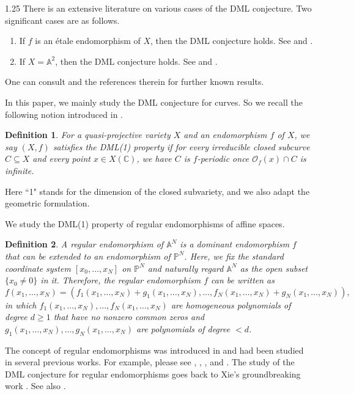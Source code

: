 \documentclass[12pt]{article}
\newtheorem{definition}{Definition}[section]
\begin{document}
\begin{spacing}{1.25}
There is an extensive literature on various cases of the DML conjecture. Two significant cases are as follows.

\begin{enumerate}
\item
If $f$ is an \'etale endomorphism of $X$, then the DML conjecture holds. See \cite{Bel06} and \cite[Theorem 1.3]{BGT10}.
\item
If $X = \mathbb{A}^2$, then the DML conjecture holds. See \cite{Xie17} and \cite[Theorem 4]{Xie}.
\end{enumerate}

One can consult \cite{BGT16,Xie} and the references therein for further known results.

In this paper, we mainly study the DML conjecture for curves. So we recall the following notion introduced in \cite[Definition 3]{Xie}.

\begin{definition}\label{DML1}
For a quasi-projective variety $X$ and an endomorphism $f$ of $X$, we say $(X,f)$ satisfies the \emph{DML(1) property} if for every irreducible closed subcurve $C\subseteq X$ and every point $x\in X(\mathbb{C})$, we have $C$ is $f$-periodic once $\mathcal{O}_f(x)\cap C$ is infinite.
\end{definition}

Here ``1" stands for the dimension of the closed subvariety, and we also adapt the geometric formulation.

We study the DML(1) property of regular endomorphisms of affine spaces.

\begin{definition}\label{regendo}
A \emph{regular endomorphism} of $\mathbb{A}^N$ is a dominant endomorphism $f$ that can be extended to an endomorphism of $\mathbb{P}^N$. Here, we fix the standard coordinate system $[x_0,\dots,x_N]$ on $\mathbb{P}^N$ and naturally regard $\mathbb{A}^N$ as the open subset $\{x_0\neq0\}$ in it. Therefore, the regular endomorphism $f$ can be written as
$$
f(x_1,\dots,x_N)=(f_1(x_1,\dots,x_N)+g_1(x_1,\dots,x_N),\dots,f_N(x_1,\dots,x_N)+g_N(x_1,\dots,x_N)),
$$
in which $f_1(x_1,\dots,x_N),\dots,f_N(x_1,\dots,x_N)$ are homogeneous polynomials of degree $d\geq1$ that have no nonzero common zeros and $g_1(x_1,\dots,x_N),\dots,g_N(x_1,\dots,x_N)$ are polynomials of degree $<d$.
\end{definition}

The concept of regular endomorphisms was introduced in \cite{BJ00} and had been studied in several previous works. For example, please see \cite[Subsections 1.4--1.5]{Xie24}, \cite{DFR}, \cite[Subsection 1.2]{Zhong}, and \cite[Subsection 1.2]{JXZ}. The study of the DML conjecture for regular endomorphisms goes back to Xie's groundbreaking work \cite{Xie17}. See also \cite{YZ}.


\end{spacing}
\end{document}
